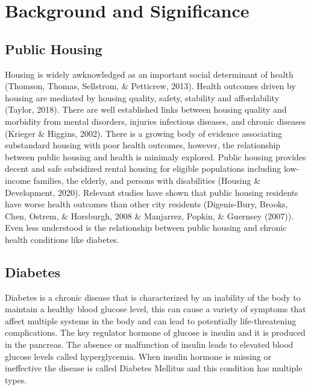 \documentclass [11pt, proquest] {uwthesis}[2015/03/03]
\begin{document}
\titlepage
  \pagebreak


\copyrightpage

\setcounter{page}{-1}

\tableofcontents
\listoffigures
\listoftables



\textpages


\chapter{Background and Significance}\label{rmd-basics}

\section{Public Housing}\label{public-housing}

Housing is widely awknowledged as an important social determinant of
health (Thomson, Thomas, Sellstrom, \& Petticrew, 2013). Health outcomes
driven by housing are mediated by housing quality, safety, stability and
affordability (Taylor, 2018). There are well established links between
housing quality and morbidity from mental disorders, injuries infectious
diseases, and chronic diseases (Krieger \& Higgins, 2002). There is a
growing body of evidence associating substandard housing with poor
health outcomes, however, the relationship between public housing and
health is minimaly explored. Public housing provides decent and safe
subsidized rental housing for eligible populations including low-income
families, the elderly, and persons with disabilities (Housing \&
Development, 2020). Relevant studies have shown that public housing
residents have worse health outcomes than other city residents
(Digenis-Bury, Brooks, Chen, Ostrem, \& Horsburgh, 2008 \& Manjarrez,
Popkin, \& Guernsey (2007)). Even less understood is the relationship
between public housing and chronic health conditions like diabetes.

\section{Diabetes}\label{diabetes}

Diabetes is a chronic disease that is characterized by an inability of
the body to maintain a healthy blood glucose level, this can cause a
variety of symptoms that affect multiple systems in the body and can
lead to potentially life-threatening complications. The key regulator
hormone of glucose is insulin and it is produced in the pancreas. The
absence or malfunction of insulin leads to elevated blood glucose levels
called hyperglycemia. When insulin hormone is missing or ineffective the
disease is called Diabetes Mellitus and this condition has multiple
types.
\end{document}
